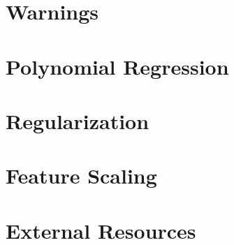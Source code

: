 \documentclass{article}
\begin{document}
\section{Warnings}

\section{Polynomial Regression}

\section{Regularization}

\section{Feature Scaling}

\section{External Resources}
\end{document}
